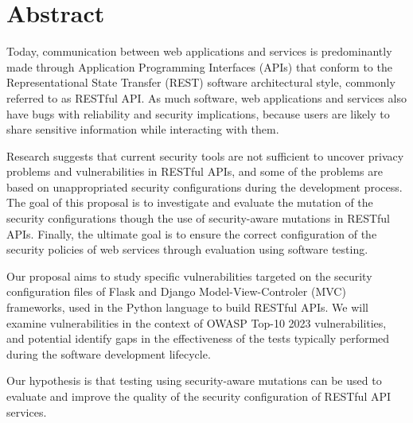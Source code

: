\chapter*{Abstract}

Today, communication between web applications and services is predominantly made through Application Programming Interfaces (APIs) 
that conform to the Representational State Transfer (REST) software architectural style, commonly referred to as RESTful API. 
As much software, web applications and services also have bugs with reliability and security implications, 
because users are likely to share sensitive information while interacting with them.

Research suggests that current security tools are not sufficient to uncover privacy problems and vulnerabilities in RESTful APIs, 
and some of the problems are based on unappropriated security configurations during the development process.
The goal of this proposal is to investigate and evaluate the mutation of the security configurations 
though the use of security-aware mutations in RESTful APIs. 
Finally, the ultimate goal is to ensure the correct configuration of the security policies of web services through evaluation using software testing.


Our proposal aims to study specific vulnerabilities targeted on the security configuration files of Flask and Django Model-View-Controler (MVC) frameworks,
used in the Python language to build RESTful APIs. 
We will examine vulnerabilities in the context of OWASP Top-10 2023 vulnerabilities, and potential identify gaps in the effectiveness of the tests typically performed 
during the software development lifecycle.

Our hypothesis is that testing using security-aware mutations can be used to evaluate and improve the quality of the security configuration of RESTful API services.
